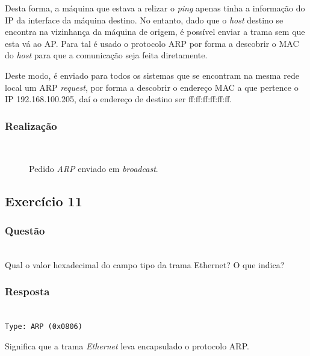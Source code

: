 \documentclass{llncs}
\begin{document}
Desta forma, a máquina que estava a relizar o \textit{ping} apenas tinha a informação do IP da interface da máquina destino. No entanto, dado que o \textit{host} destino se encontra na vizinhança da máquina de origem, é possível enviar a trama sem que esta vá ao AP. Para tal é usado o protocolo ARP por forma a descobrir o MAC do \textit{host} para que a comunicação seja feita diretamente.

Deste modo, é enviado para todos os sistemas que se encontram na mesma rede local um ARP \textit{request}, por forma a descobrir o endereço MAC a que pertence o IP 192.168.100.205, daí o endereço de destino ser ff:ff:ff:ff:ff:ff. 

\subsubsection{Realização}\rule[-10pt]{0pt}{10pt}\\

\begin{figure}
	\caption{Pedido \textit{ARP} enviado em \textit{broadcast}.}
	\label{fig:arp_request}
\end{figure} 


\clearpage
\subsection{Exercício 11}
\subsubsection{Questão}\rule[-10pt]{0pt}{10pt}\\

Qual o valor hexadecimal do campo tipo da trama Ethernet? O que indica?

\subsubsection{Resposta}\rule[-10pt]{0pt}{10pt}\\

\texttt{Type: ARP (0x0806)} 

Significa que a trama \textit{Ethernet} leva encapsulado o protocolo ARP.
\end{document}
